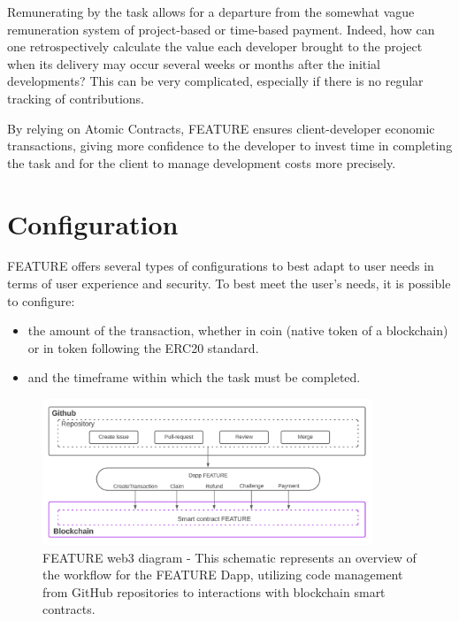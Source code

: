 \documentclass[
	a4paper, %
	10pt, %
	unnumberedsections, %
	twoside, %
]{LTJournalArticle}
\begin{document}
Remunerating by the task allows for a departure from the somewhat vague remuneration system of project-based or time-based payment. Indeed, how can one retrospectively calculate the value each developer brought to the project when its delivery may occur several weeks or months after the initial developments? This can be very complicated, especially if there is no regular tracking of contributions.

By relying on Atomic Contracts, FEATURE ensures client-developer economic transactions, giving more confidence to the developer to invest time in completing the task and for the client to manage development costs more precisely.


\section{Configuration}

FEATURE offers several types of configurations to best adapt to user needs in terms of user experience and security. To best meet the user's needs, it is possible to configure:

\begin{itemize}
\item
  the amount of the transaction, whether in coin (native token of a blockchain) or in token following the ERC20 standard.
\item
  and the timeframe within which the task must be completed.
\end{itemize}

\begin{figure}[ht]
  \centering
  \includegraphics[width=0.88\textwidth]{media/diagram_web3_Feature.png}
  \caption{FEATURE web3 diagram - This schematic represents an overview of the workflow for the FEATURE Dapp, utilizing code management from GitHub repositories to interactions with blockchain smart contracts.}
  \label{fig:web3 diagram}
\end{figure}
\end{document}
